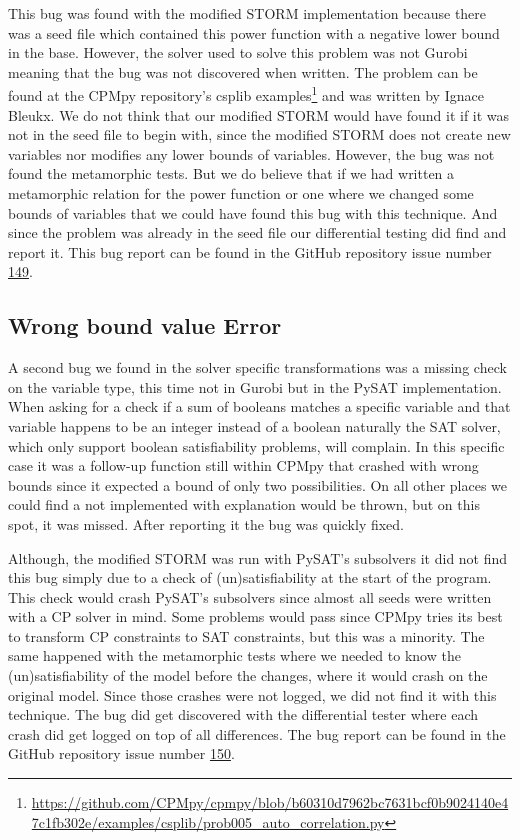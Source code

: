 This bug was found with the modified STORM implementation because there was a seed file which contained this power function with a negative lower bound in the base. However, the solver used to solve this problem was not Gurobi meaning that the bug was not discovered when written. The problem can be found at the CPMpy repository's csplib examples\footnote{\url{https://github.com/CPMpy/cpmpy/blob/b60310d7962bc7631bcf0b9024140e47c1fb302e/examples/csplib/prob005_auto_correlation.py}} and was written by Ignace Bleukx. We do not think that our modified STORM would have found it if it was not in the seed file to begin with, since the modified STORM does not create new variables nor modifies any lower bounds of variables. However, the bug was not found the metamorphic tests. But we do believe that if we had written a metamorphic relation for the power function or one where we changed some bounds of variables that we could have found this bug with this technique. And since the problem was already in the seed file our differential testing did find and report it.
This bug report can be found in the GitHub repository issue number \href{https://github.com/CPMpy/cpmpy/issues/149}{149}.

\subsection{Wrong bound value Error}
\label{res:bug:WrongBounds}
A second bug we found in the solver specific transformations was a missing check on the variable type, this time not in Gurobi but in the PySAT implementation. When asking for a check if a sum of booleans matches a specific variable and that variable happens to be an integer instead of a boolean naturally the SAT solver, which only support boolean satisfiability problems, will complain. In this specific case it was a follow-up function still within CPMpy that crashed with wrong bounds since it expected a bound of only two possibilities. On all other places we could find a not implemented with explanation would be thrown, but on this spot, it was missed. After reporting it the bug was quickly fixed.

Although, the modified STORM was run with PySAT's subsolvers it did not find this bug simply due to a check of (un)satisfiability at the start of the program. This check would crash PySAT's subsolvers since almost all seeds were written with a CP solver in mind. Some problems would pass since CPMpy tries its best to transform CP constraints to SAT constraints, but this was a minority. The same happened with the metamorphic tests where we needed to know the (un)satisfiability of the model before the changes, where it would crash on the original model. Since those crashes were not logged, we did not find it with this technique. The bug did get discovered with the differential tester where each crash did get logged on top of all differences. The bug report can be found in the GitHub repository issue number \href{https://github.com/CPMpy/cpmpy/issues/150}{150}.

